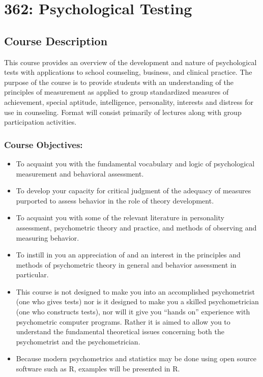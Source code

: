 \documentclass[
]{book}
\providecommand{\tightlist}{%
  \setlength{\itemsep}{0pt}\setlength{\parskip}{0pt}}
\begin{document}
\chapter*{362: Psychological Testing}\label{testing}


\section*{Course Description}\label{course-description-3}


This course provides an overview of the development and nature of psychological tests with applications to school counseling, business, and clinical practice. The purpose of the course is to provide students with an understanding of the principles of measurement as applied to group standardized measures of achievement, special aptitude, intelligence, personality, interests and distress for use in counseling. Format will consist primarily of lectures along with group participation activities.

\subsection*{Course Objectives:}\label{course-objectives}


\begin{itemize}
\tightlist
\item
  To acquaint you with the fundamental vocabulary and logic of psychological measurement and behavioral assessment.
\item
  To develop your capacity for critical judgment of the adequacy of measures purported to assess behavior in the role of theory development.
\item
  To acquaint you with some of the relevant literature in personality assessment, psychometric theory and practice, and methods of observing and measuring behavior.
\item
  To instill in you an appreciation of and an interest in the principles and methods of psychometric theory in general and behavior assessment in particular.
\item
  This course is not designed to make you into an accomplished psychometrist (one who gives tests) nor is it designed to make you a skilled psychometrician (one who constructs tests), nor will it give you ``hands on'' experience with psychometric computer programs. Rather it is aimed to allow you to understand the fundamental theoretical issues concerning both the psychometrist and the psychometrician.
\item
  Because modern psychometrics and statistics may be done using open source software such as R, examples will be presented in R.
\end{itemize}
\end{document}

